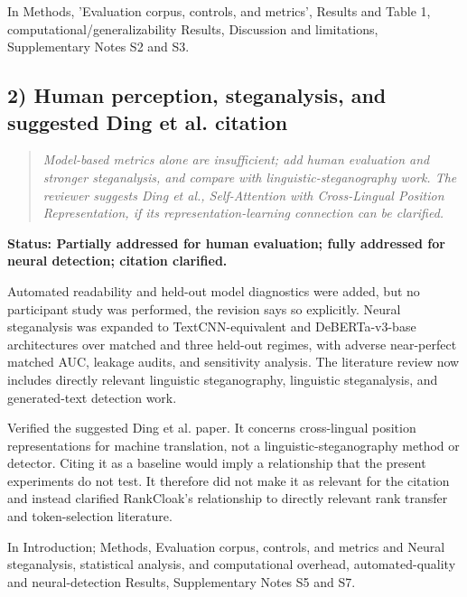 \documentclass[11pt]{article}
\newcommand{\Status}[1]{\textbf{Status: #1.}}
\newenvironment{reviewcomment}{\begin{quote}\color{commentgray}\itshape}{\end{quote}}
\begin{document}
In Methods, 'Evaluation corpus, controls, and metrics', Results and Table 1, computational/generalizability Results, Discussion and limitations, Supplementary Notes S2 and S3.

\subsection*{2) Human perception, steganalysis, and suggested Ding et al. citation}
\begin{reviewcomment}
Model-based metrics alone are insufficient; add human evaluation and stronger steganalysis, and compare with linguistic-steganography work. The reviewer suggests Ding et al., \emph{Self-Attention with Cross-Lingual Position Representation}, if its representation-learning connection can be clarified.
\end{reviewcomment}

\Status{Partially addressed for human evaluation; fully addressed for neural detection; citation clarified}

Automated readability and held-out model diagnostics were added, but no participant study was performed, the revision says so explicitly. Neural steganalysis was expanded to TextCNN-equivalent and DeBERTa-v3-base architectures over matched and three held-out regimes, with adverse near-perfect matched AUC, leakage audits, and sensitivity analysis. The literature review now includes directly relevant linguistic steganography, linguistic steganalysis, and generated-text detection work.

 Verified the suggested Ding et al. paper. It concerns cross-lingual position representations for machine translation, not a linguistic-steganography method or detector. Citing it as a baseline would imply a relationship that the present experiments do not test. It therefore did not make it as relevant for the citation and instead clarified RankCloak's relationship to directly relevant rank transfer and token-selection literature.

In Introduction; Methods, Evaluation corpus, controls, and metrics and Neural steganalysis, statistical analysis, and computational overhead, automated-quality and neural-detection Results, Supplementary Notes S5 and S7.


\end{document}
